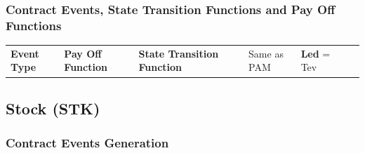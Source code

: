 \documentclass[9pt,oneside]{amsart}
\begin{document}


\vspace{\baselineskip}
\subsubsection{Contract Events, State Transition Functions and Pay Off Functions}




\begin{table}[H]
 			\centering
\begin{tabular}{p{0.4in}p{2.8in}p{-0.58in}p{0.15in}p{0.05in}p{0.23in}p{0.01in}p{0.02in}}
\hline
\multicolumn{1}{|p{0.4in}}{\textbf{Event Type}} & 
\multicolumn{1}{|p{2.8in}}{\textbf{Pay Off Function}} & 
\multicolumn{1}{|p{-0.58in}}{\textbf{State Transition Function}} & 

\hhline{---}
\multicolumn{1}{|p{0.4in}}{AD} & 
\multicolumn{1}{|p{2.8in}}{Same as PAM} & 
\multicolumn{1}{|p{-0.58in}}{\textbf{Led }= Tev} & 

\hhline{---}

\end{tabular}
 \end{table}




\vspace{\baselineskip}
\subsection{Stock (STK)}
\subsubsection{Contract Events Generation}


\end{document}
